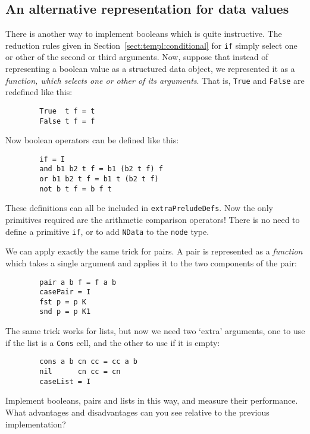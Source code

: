 \subsection{An alternative representation for data values}
\label{sect:template:data-str-hof}

There is another way to implement booleans
which is quite instructive.
The reduction rules given in Section~\ref{sect:templ:conditional}
for \mbox{\tt if} simply select one or other of
the second or third arguments.
Now, suppose that instead of representing a boolean value as a structured
data object, we represented it as a {\em function,
which selects one or other of its arguments}.  That is, \mbox{\tt True} and
\mbox{\tt False} are redefined like this:
\begin{verbatim}
        True  t f = t
        False t f = f
\end{verbatim}
Now boolean operators can be defined like this:
\begin{verbatim}
        if = I
        and b1 b2 t f = b1 (b2 t f) f
        or b1 b2 t f = b1 t (b2 t f)
        not b t f = b f t
\end{verbatim}
These definitions can all be included in \mbox{\tt extraPreludeDefs}.
Now the only primitives required are the arithmetic comparison operators!
There is no need to define a primitive \mbox{\tt if}, or
to add \mbox{\tt NData} to the \mbox{\tt node} type.

We can apply exactly the same trick for pairs.  A pair is represented
as a {\em function\/} which takes a single argument and applies it to the
two components of the pair:
\begin{verbatim}
        pair a b f = f a b
        casePair = I
        fst p = p K
        snd p = p K1
\end{verbatim}
The same trick works for lists, but now we need two `extra' arguments,
one to use if the list is a \mbox{\tt Cons} cell, and the other to use if it is empty:
\begin{verbatim}
        cons a b cn cc = cc a b
        nil      cn cc = cn
        caseList = I
\end{verbatim}

\begin{exercise}
Implement booleans, pairs and lists in this way, and measure
their performance.
What advantages and disadvantages
can you see relative to the previous implementation?
\end{exercise}


